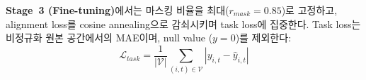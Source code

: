 \textbf{Stage~3 (Fine-tuning)}에서는 마스킹 비율을 최대($r_{mask} = 0.85$)로 고정하고, alignment loss를 cosine annealing으로 감쇠시키며 task loss에 집중한다. Task loss는 비정규화 원본 공간에서의 MAE이며, null value ($y = 0$)를 제외한다:
%
\begin{equation}
  \mathcal{L}_{task} = \frac{1}{|\mathcal{V}|} \sum_{(i,t) \in \mathcal{V}} |y_{i,t} - \hat{y}_{i,t}|
\end{equation}
